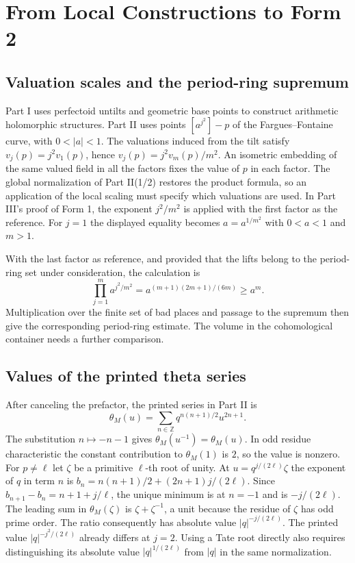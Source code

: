 \documentclass[UTF8,fontset=none,zihao=-4,a4paper]{ctexart}
\newcommand{\Z}{\mathbb Z}
\begin{document}
\section{From Local Constructions to Form 2}
\subsection{Valuation scales and the period-ring supremum}
Part I uses perfectoid untilts and geometric base points to construct arithmetic holomorphic structures. Part II uses points \([a^{j^2}]-p\) of the Fargues--Fontaine curve, with \(0<|a|<1\). The valuations induced from the tilt satisfy \(v_j(p)=j^2v_1(p)\), hence \(v_j(p)=j^2v_m(p)/m^2\). An isometric embedding of the same valued field in all the factors fixes the value of \(p\) in each factor. The global normalization of Part II(1/2) restores the product formula, so an application of the local scaling must specify which valuations are used. In Part III's proof of Form 1, the exponent \(j^2/m^2\) is applied with the first factor as the reference. For \(j=1\) the displayed equality becomes \(a=a^{1/m^2}\) with \(0<a<1\) and \(m>1\).\cite{ji,jii,jhalf,jiii}

With the last factor as reference, and provided that the lifts belong to the period-ring set under consideration, the calculation is
\[
 \prod_{j=1}^m a^{j^2/m^2}=a^{(m+1)(2m+1)/(6m)}\ge a^m.
\]
Multiplication over the finite set of bad places and passage to the supremum then give the corresponding period-ring estimate. The volume in the cohomological container needs a further comparison.\cite{jiii}

\subsection{Values of the printed theta series}
After canceling the prefactor, the printed series in Part II is
\[
 \theta_M(u)=\sum_{n\in\Z}q^{n(n+1)/2}u^{2n+1}.
\]
The substitution \(n\mapsto -n-1\) gives \(\theta_M(u^{-1})=\theta_M(u)\). In odd residue characteristic the constant contribution to \(\theta_M(1)\) is \(2\), so the value is nonzero. For \(p\ne\ell\) let \(\zeta\) be a primitive \(\ell\)-th root of unity. At \(u=q^{j/(2\ell)}\zeta\) the exponent of \(q\) in term \(n\) is \(b_n=n(n+1)/2+(2n+1)j/(2\ell)\). Since \(b_{n+1}-b_n=n+1+j/\ell\), the unique minimum is at \(n=-1\) and is \(-j/(2\ell)\). The leading sum in \(\theta_M(\zeta)\) is \(\zeta+\zeta^{-1}\), a unit because the residue of \(\zeta\) has odd prime order. The ratio consequently has absolute value \(|q|^{-j/(2\ell)}\). The printed value \(|q|^{-j^2/(2\ell)}\) already differs at \(j=2\). Using a Tate root directly also requires distinguishing its absolute value \(|q|^{1/(2\ell)}\) from \(|q|\) in the same normalization.\cite{jii,jiii}
\end{document}
